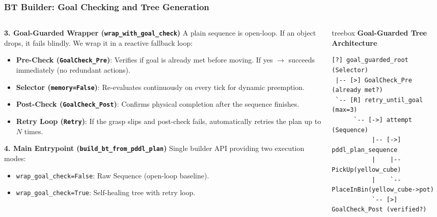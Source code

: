 \documentclass[10pt]{beamer}
\begin{document}
\begin{frame}[fragile]
\frametitle{BT Builder: Goal Checking and Tree Generation}
\begin{columns}[T]
    \begin{column}{0.53\textwidth}
        \small \textbf{3. Goal-Guarded Wrapper (\texttt{wrap\_with\_goal\_check})}
        \scriptsize
        A plain sequence is open-loop. If an object drops, it fails blindly. We wrap it in a reactive fallback loop:
        \begin{itemize}
            \item \textbf{Pre-Check (\texttt{GoalCheck\_Pre})}: Verifies if goal is already met before moving. If yes $\to$ succeeds immediately (no redundant actions).
            \item \textbf{Selector (\texttt{memory=False})}: Re-evaluates continuously on every tick for dynamic preemption.
            \item \textbf{Post-Check (\texttt{GoalCheck\_Post})}: Confirms physical completion after the sequence finishes.
            \item \textbf{Retry Loop (\texttt{Retry})}: If the grasp slips and post-check fails, automatically retries the plan up to $N$ times.
        \end{itemize}

        \vspace{0.15cm}
        \small \textbf{4. Main Entrypoint (\texttt{build\_bt\_from\_pddl\_plan})}
        \scriptsize
        Single builder API providing two execution modes:
        \begin{itemize}
            \item \texttt{wrap\_goal\_check=False}: Raw Sequence (open-loop baseline).
            \item \texttt{wrap\_goal\_check=True}: Self-healing tree with retry loop.
        \end{itemize}
    \end{column}

    \begin{column}{0.47\textwidth}
        \begin{beamercolorbox}[sep=5pt,rounded=true,shadow=true]{treebox}
            \scriptsize \textbf{Goal-Guarded Tree Architecture}
            \tiny
            \begin{verbatim}
[?] goal_guarded_root (Selector)
 |-- [>] GoalCheck_Pre (already met?)
 `-- [R] retry_until_goal (max=3)
      `-- [->] attempt (Sequence)
           |-- [->] pddl_plan_sequence
           |    |-- PickUp(yellow_cube)
           |    `-- PlaceInBin(yellow_cube->pot)
           `-- [>] GoalCheck_Post (verified?)
            \end{verbatim}
        \end{beamercolorbox}


\end{column}
\end{columns}
\end{frame}
\end{document}
